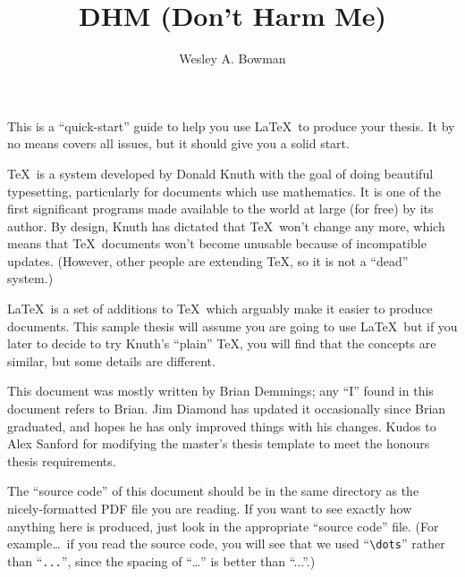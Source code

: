 

\title{DHM (Don't Harm Me)}
\author{Wesley A. Bowman}

\beforepreface
{}

This is a ``quick-start'' guide to help you use \LaTeX\ to produce
your thesis.  It by no means covers all issues, but it should give you
a solid start.

\TeX\ is a system developed by Donald Knuth with the goal of doing
beautiful typesetting, particularly for documents which use
mathematics.  It is one of the first significant programs made
available to the world at large (for free) by its author.  By design,
Knuth has dictated that \TeX\ won't change any more, which means
that \TeX\ documents won't become unusable because of incompatible
updates.  (However, other people are extending \TeX, so it is not a
``dead'' system.)

\LaTeX\ is a set of additions to \TeX\ which arguably make it easier
to produce documents.  This sample thesis will assume you are going to
use \LaTeX\, but if you later to decide to try Knuth's ``plain'' \TeX,
you will find that the concepts are similar, but some details are
different.

This document was mostly written by Brian Demmings; any ``I'' found in
this document refers to Brian.  Jim Diamond has updated it
occasionally since Brian graduated, and hopes he has only improved
things with his changes.  Kudos to Alex Sanford for modifying the
master's thesis template to meet the honours thesis requirements.

The ``source code'' of this document should be in the same directory
as the nicely-formatted PDF file you are reading.  If you want to see
exactly how anything here is produced, just look in the appropriate
``source code'' file.  (For example\dots\ if you read the source code,
you will see that we used ``\verb|\dots|'' rather than ``\verb|...|'',
since the spacing of ``\dots'' is better than ``...''.)

